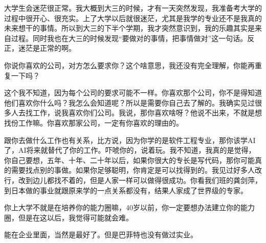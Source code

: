 

大学生会迷茫很正常。我大概到大三的时候，才有一天突然发现，我准备考大学的过程中很开心、很充实。上了大学以后就很迷茫，尤其是我学的专业还不是我真的未来想干的事情。所以到大三的下半个学期，我才突然意识到，我的乐趣其实是来自过程。同时我也在大三的时候发现“要做对的事情，把事情做对”这一句话。反正，迷茫是正常的啊。

你说你喜欢的公司，对方怎么要求你？这个啥意思，我还没有完全理解，你能再重复一下吗？


这个我不知道，因为每个公司的要求可能不一样。你喜欢那个公司，你不是得知道他们喜欢你什么吗？我怎么会知道呢？所以是需要你自己去了解的。我确实见过很多人去找工作，说我喜欢你们公司。我说，那你喜欢啥呀？他说不出来，不就是想找份工作嘛。你喜欢那家公司，一定有你喜欢的理由的。

跟你去做什么工作也有关系，比方说，因为你学的是软件工程专业，那你该学AI了，AI将来就替代了你的工作。吓唬你的，说着玩。我不知道，我真的是觉得，你自己要想，五年、十年、二十年以后，如果你很大的专长是写代码，那你可能真的需要找点别的事做。如果你足够聪明，你肯定是可以找得到的。我见过好多人改行，改到边儿都找不着的，但是人家一样可以做得很成功。你看我们班的龚剑萍，到日本做的事业就跟原来学的一点关系都没有，结果人家成了世界级的专家。



你上大学不就是在培养你的能力圈嘛，40岁以前，你一定要想办法建立你的能力圈，但是在这以后，我觉得可能就会难。


能在企业里面，当然是最好了。但是巴菲特也没有做过实业。
